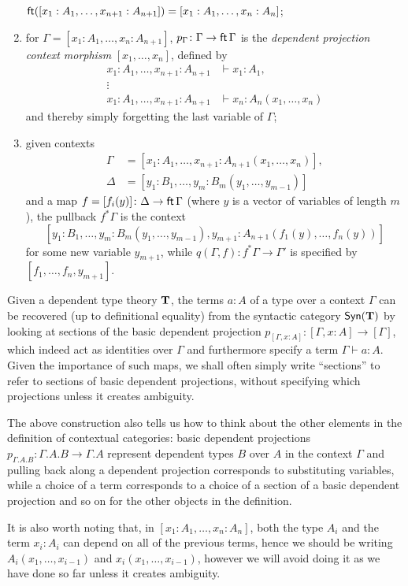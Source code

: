 \begin{construction}
\begin{enumerate}
      $\operatorname{\mathsf{ft}}([x_1:A_1,\ldots,x_{n+1}:A_{n+1}])=[x_1:A_1,\ldots,x_n:A_n]$;
    \item for $\Gamma=[x_1:A_1,\ldots,x_n:A_{n+1}]$,
      $p_{\Gamma}\colon\Gamma\rightarrow \operatorname{\mathsf{ft}}\Gamma$ is the \emph{dependent
      projection context morphism} $[x_1,\ldots,x_n]$, defined by
      \begin{align*}
        x_1:A_1,\ldots,x_{n+1}:A_{n+1} &\vdash x_1:A_1, \\
        \vdots & \\
        x_1:A_1,\ldots,x_{n+1}:A_{n+1} &\vdash x_n:A_n(x_1,\ldots,x_n)
      \end{align*}
      and thereby simply forgetting the last variable of $\Gamma$;
    \item given contexts
      \begin{align*}
        \Gamma &=[x_1:A_1,\ldots,x_{n+1}:A_{n+1}(x_1,\ldots,x_n)], \\
        \Delta &=[y_1:B_1,\ldots,y_m:B_m(y_1,\ldots,y_{m-1})]
      \end{align*}
      and a map $f=[f_i(y)]\colon\Delta\rightarrow\operatorname{\mathsf{ft}}\Gamma$ (where $y$ is a
      vector of variables of length $m$), the pullback $f^*\Gamma$ is the
      context
      \[[y_1:B_1,\ldots,y_m:B_m(y_1,\ldots,y_{m-1}),y_{m+1}:A_{n+1}(f_1(y),\ldots,f_n(y))]\]
      for some new variable $y_{m+1}$, while $q(\Gamma,f)\colon
      f^*\Gamma\rightarrow\Gamma'$ is specified by $[f_1,\ldots,f_n,y_{m+1}]$.
  \end{enumerate}
\end{construction}

\begin{rmk}
  Given a dependent type theory $\operatorname{\mathbf{T}}$, the terms $a:A$ of a type over a context
  $\Gamma$ can be recovered (up to definitional equality) from the syntactic
  category $\mathsf{Syn}(\mathbf{\operatorname{\mathbf{T}}})$ by looking at sections of the basic dependent projection
  $p_{[\Gamma,x:A]}\colon[\Gamma,x:A]\rightarrow[\Gamma]$, which indeed act as
  identities over $\Gamma$ and furthermore specify a term $\Gamma\vdash a:A$.
  Given the importance of such maps, we shall often simply write ``sections'' to
  refer to sections of basic dependent projections, without specifying which
  projections unless it creates ambiguity.

  The above construction also tells us how to think about the other elements in
  the definition of contextual categories: basic dependent
  projections $p_{\Gamma.A.B}\colon\Gamma.A.B\rightarrow\Gamma.A$ represent
  dependent types $B$ over $A$ in the context $\Gamma$ and pulling back along
  a dependent projection corresponds to substituting variables, while a choice of
  a term corresponds to a choice of a section of a basic dependent projection
  and so on for the other objects in the definition.

  It is also worth noting that, in $[x_1:A_1,\ldots,x_n:A_n]$, both the type
  $A_i$ and the term $x_i:A_i$ can depend on all of the previous terms, hence we
  should be writing $A_i(x_1,\ldots,x_{i-1})$ and $x_i(x_1,\ldots,x_{i-1})$,
  however we will avoid doing it as we have done so far unless it creates
  ambiguity.
\end{rmk}

